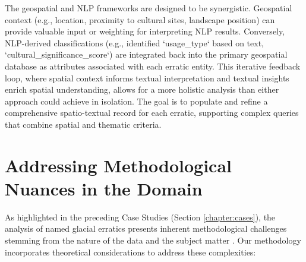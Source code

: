 The geospatial and NLP frameworks are designed to be synergistic. Geospatial context (e.g., location, proximity to cultural sites, landscape position) can provide valuable input or weighting for interpreting NLP results. Conversely, NLP-derived classifications (e.g., identified `usage\_type` based on text, `cultural\_significance\_score`) are integrated back into the primary geospatial database as attributes associated with each erratic entity. This iterative feedback loop, where spatial context informs textual interpretation and textual insights enrich spatial understanding, allows for a more holistic analysis than either approach could achieve in isolation. The goal is to populate and refine a comprehensive spatio-textual record for each erratic, supporting complex queries that combine spatial and thematic criteria.

\section{Addressing Methodological Nuances in the Domain}
\label{sec:addressing_nuances}

As highlighted in the preceding Case Studies (Section \ref{chapter:cases}), the analysis of named glacial erratics presents inherent methodological challenges stemming from the nature of the data and the subject matter \cite{Gregory2013}. Our methodology incorporates theoretical considerations to address these complexities:

